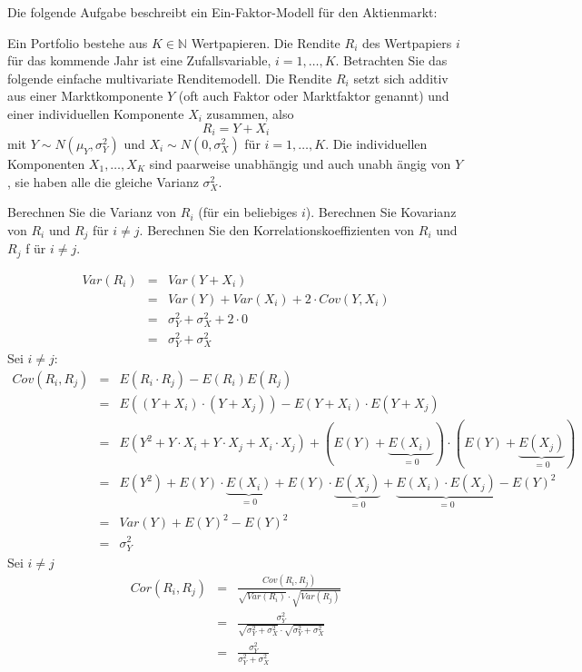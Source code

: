 \newcommand{\woche}{}
\newcommand{\nr}{3}
\newcommand{\thema}{}


\begin{Exercise}

Die folgende Aufgabe beschreibt ein Ein-Faktor-Modell f\"{u}r den Aktienmarkt:

Ein Portfolio bestehe aus $K\in\mathbb{N}$ Wertpapieren. Die Rendite $R_{i}$ des
Wertpapiers $i$ f\"{u}r das kommende Jahr ist eine Zufallsvariable, $%
i=1,\ldots ,K$. Betrachten Sie das folgende einfache multivariate
Renditemodell. Die Rendite $R_{i}$ setzt sich additiv aus einer
Marktkomponente $Y$ (oft auch Faktor oder Marktfaktor genannt) und einer
individuellen Komponente $X_{i}$ zusammen, also%
\begin{equation*}
	R_{i}=Y+X_{i}
\end{equation*}%
mit $Y\sim N\left( \mu _{Y},\sigma _{Y}^{2}\right) $ und $X_{i}\sim N\left(
0,\sigma _{X}^{2}\right) $ f\"{u}r $i=1,\ldots ,K$. Die individuellen
Komponenten $X_{1},\ldots ,X_{K}$ sind paarweise unabh\"{a}ngig und auch unabh%
\"{a}ngig von $Y$, sie haben alle die gleiche Varianz $\sigma _{X}^{2}.$

	\Question Berechnen Sie die Varianz von $R_{i}$ (f\"{u}r ein beliebiges $i$).
	\Question Berechnen Sie Kovarianz von $R_{i}$ und $R_{j}$ f\"{u}r $i\neq j$.
	\Question Berechnen Sie den Korrelationskoeffizienten von $R_{i}$ und $R_{j}$ f%
	\"{u}r $i\neq j$.

\end{Exercise}
\begin{Answer}
\Question 
\begin{eqnarray*}
	Var(R_i)&=& Var(Y+X_i)\\
	&=& Var(Y)+Var(X_i)+2\cdot  Cov(Y,X_i)\\
	&=&\sigma_Y^2+\sigma_X^2+2\cdot 0\\
	&=&\sigma_Y^2+\sigma_X^2
\end{eqnarray*}
\Question Sei $i\neq j$:
\begin{eqnarray*}
	Cov(R_i,R_j)&=&E(R_i\cdot R_j)-E(R_i)E(R_j)\\
	&=&E((Y+X_i)\cdot (Y+X_j))-E(Y+X_i)\cdot E(Y+X_j)\\
	&=&E(Y^2+Y\cdot X_i+Y\cdot X_j+X_i\cdot X_j)+(E(Y)+\underbrace{E(X_i)}_{=0})\cdot(E(Y)+\underbrace{E(X_j)}_{=0})\\
	&=&E(Y^2)+E(Y)\cdot \underbrace{E(X_i)}_{=0}+E(Y)\cdot \underbrace{E(X_j)}_{=0}+\underbrace{E(X_i)\cdot E(X_j)}_{=0}-E(Y)^2\\
	&=&Var(Y)+E(Y)^2-E(Y)^2\\
	&=&\sigma_Y^2
\end{eqnarray*}
\Question Sei $i\neq j$
\begin{eqnarray*}
	Cor(R_i,R_j)&=&\frac{Cov(R_i,R_j)}{\sqrt{Var(R_i)}\cdot \sqrt{Var(R_j)}}\\
	&=&\frac{\sigma_Y^2}{\sqrt{\sigma_Y^2+\sigma_X^2}\cdot \sqrt{\sigma_Y^2+\sigma_X^2}}\\
	&=&\frac{\sigma_Y^2}{\sigma_Y^2+\sigma_X^2}
\end{eqnarray*}
\end{Answer}


